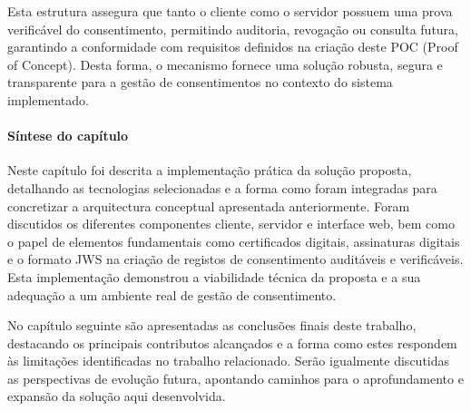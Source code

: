 Esta estrutura assegura que tanto o cliente como o servidor possuem uma prova verificável do consentimento, permitindo auditoria, revogação ou consulta futura, garantindo a conformidade com requisitos definidos na criação deste POC (Proof of Concept). Desta forma, o mecanismo fornece uma solução robusta, segura e transparente para a gestão de consentimentos no contexto do sistema implementado.

\paragraph*{Síntese do capítulo}

Neste capítulo foi descrita a implementação prática da solução proposta, detalhando as tecnologias selecionadas e a forma como foram integradas para concretizar a arquitectura conceptual apresentada anteriormente. Foram discutidos os diferentes componentes cliente, servidor e interface web, bem como o papel de elementos fundamentais como certificados digitais, assinaturas digitais e o formato JWS na criação de registos de consentimento auditáveis e verificáveis. Esta implementação demonstrou a viabilidade técnica da proposta e a sua adequação a um ambiente real de gestão de consentimento.

No capítulo seguinte são apresentadas as conclusões finais deste trabalho, destacando os principais contributos alcançados e a forma como estes respondem às limitações identificadas no trabalho relacionado. Serão igualmente discutidas as perspectivas de evolução futura, apontando caminhos para o aprofundamento e expansão da solução aqui desenvolvida.
